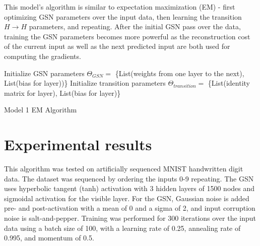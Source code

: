This model's algorithm is similar to expectation maximization (EM) - first optimizing GSN parameters over the input data, then learning the transition \(H \rightarrow H\) parameters, and repeating. After the initial GSN pass over the data, training the GSN parameters becomes more powerful as the reconstruction cost of the current input as well as the next predicted input are both used for computing the gradients.

\begin{algorithm}[h!]
	Initialize GSN parameters \(\Theta_{GSN} = \) \{List(weights from one layer to the next), List(bias for layer))\}\;
	Initialize transition parameters \(\Theta_{transition}=\) \{List(identity matrix for layer), List(bias for layer)\} \;
	\caption{ Model 1 EM Algorithm }
\end{algorithm}

\section{Experimental results}

This algorithm was tested on artificially sequenced MNIST handwritten digit data. The dataset was sequenced by ordering the inputs 0-9 repeating. The GSN uses hyperbolic tangent (tanh) activation with 3 hidden layers of 1500 nodes and sigmoidal activation for the visible layer. For the GSN, Gaussian noise is added pre- and post-activation with a mean of 0 and a sigma of 2, and input corruption noise is salt-and-pepper. Training was performed for 300 iterations over the input data using a batch size of 100, with a learning rate of 0.25, annealing rate of 0.995, and momentum of 0.5.

